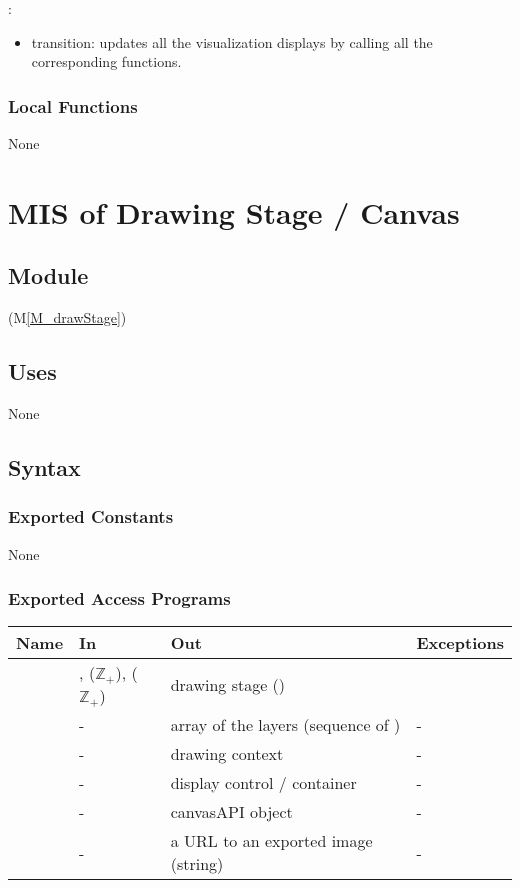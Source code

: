 \documentclass[12pt, titlepage]{article}
\newcommand{\mref}[1]{M\ref{#1}}
\newcommand{\mrefp}[1]{(\mref{#1})}
\begin{document}
\noindent {}:
\begin{itemize}
\item transition: updates all the visualization displays by calling all the corresponding
    functions.
\end{itemize}

\subsubsection{Local Functions}
None

\newpage




\section{MIS of Drawing Stage / Canvas} \label{MS_drawStage}

\subsection{Module}
 \mrefp{M_drawStage} 

\subsection{Uses}
None

\subsection{Syntax}

\subsubsection{Exported Constants}
None

\subsubsection{Exported Access Programs}

\begin{center}
\begin{tabular}{L{3cm} L{4cm} L{4cm} L{4cm}}
\hline
\textbf{Name} & \textbf{In} & \textbf{Out} & \textbf{Exceptions} \\
\hline
{} & ,  ($\mathbb{Z}_+$),  ($\mathbb{Z}_+$)
  & drawing stage () &  \\
\hline
{} & - & array of the layers (sequence of ) & - \\
\hline
{} & - & drawing context \cite{html_std_canvas} & - \\
\hline
{} & - & display control / container & - \\
\hline
{} & - & canvasAPI object \cite{html_std_canvas} & - \\
\hline
{} & - & a URL to an exported image \cite{html_std_canvas} (string) & - \\
\hline
\end{tabular}
\end{center}
\end{document}
